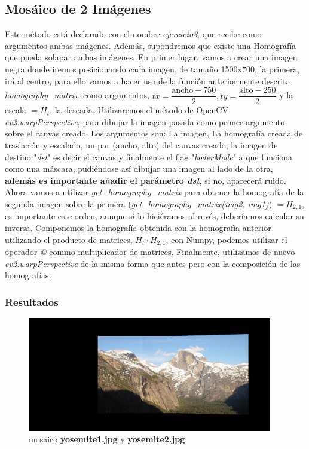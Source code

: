 \documentclass{article}
\begin{document}
\subsection{Mosáico de 2 Imágenes}
Este método está declarado con el nombre \textit{ejercicio3}, que recibe como argumentos ambas imágenes. Además, supondremos que existe una Homografía que pueda solapar ambas imágenes.\newline
\newline
En primer lugar, vamos a crear una imagen negra donde iremos posicionando cada imagen, de tamaño 1500x700, la primera, irá al centro, para ello vamos a hacer uso de la función anteriormente descrita \textit{homography\_matrix}, como argumentos, $tx=\dfrac{\text{ancho} - 750}{2}, ty=\dfrac{\text{alto} - 250}{2}$ y la escala $=H_t$, la deseada. Utilizaremos el método de OpenCV \textit{cv2.warpPerspective}, para dibujar la imagen pasada como primer argumento sobre el canvas creado. Los argumentos son: La imagen, La homografía creada de traslación y escalado, un par (ancho, alto) del canvas creado, la imagen de destino "\textit{dst}" es decir el canvas y finalmente el flag "\textit{boderMode}" a  que funciona como una máscara, pudiéndose así dibujar una imagen al lado de la otra, \textbf{además es importante añadir el parámetro \textit{dst}}, si no, aparecerá ruido. Ahora vamos a utilizar \textit{get\_homography\_matrix} para obtener la homografía de la segunda imagen sobre la primera (\textit{get\_homography\_matrix(img2, img1)}) $=H_{2,1}$, es importante este orden, aunque si lo hiciéramos al revés, deberíamos calcular su inversa. Componemos la homografía obtenida con la homografía anterior utilizando el producto de matrices, $H_t\cdot H_{2,1}$, con Numpy, podemos utilizar el operador \textit{@} commo multiplicador de matrices. Finalmente, utilizamos de nuevo \textit{cv2.warpPerspective} de la misma forma que antes pero con la composición de las homografías.


\subsubsection{Resultados}


\begin{figure}[hbt!]
	\centering
	\includegraphics[width=0.95\textwidth]{../assets/Ejercicio3-1.png}
	\caption{mosaico \textbf{yosemite1.jpg} y \textbf{yosemite2.jpg}}
\end{figure}
\end{document}
